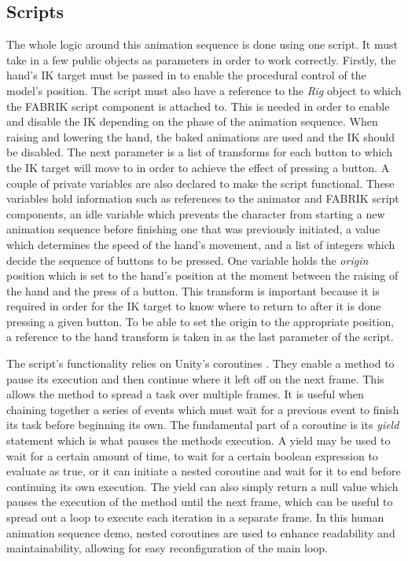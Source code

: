 \subsection{Scripts}
The whole logic around this animation sequence is done using one script. It must
take in a few public objects as parameters in order to work correctly. Firstly,
the hand's IK target must be passed in to enable the procedural control of the
model's position. The script must also have a reference to the \textit{Rig}
object to which the FABRIK script component is attached to. This is needed in
order to enable and disable the IK depending on the phase of the animation
sequence. When raising and lowering the hand, the baked animations are used and
the IK should be disabled. The next parameter is a list of transforms for each
button to which the IK target will move to in order to achieve the effect of
pressing a button. A couple of private variables are also declared to make the
script functional. These variables hold information such as references to the
animator and FABRIK script components, an idle variable which prevents the
character from starting a new animation sequence before finishing one that was
previously initiated, a value which determines the speed of the hand's movement,
and a list of integers which decide the sequence of buttons to be pressed. One
variable holds the \textit{origin} position which is set to the hand's
position at the moment between the raising of the hand and the press of
a button. This transform is important because it is required in order for the IK
target to know where to return to after it is done pressing a given button. To
be able to set the origin to the appropriate position, a reference to the hand
transform is taken in as the last parameter of the script.

The script's functionality relies on Unity's coroutines \cite{unity_coroutines}.
They enable a method to pause its execution and then continue where it left off
on the next frame. This allows the method to spread a task over multiple frames.
It is useful when chaining together a series of events which must wait for
a previous event to finish its task before beginning its own. The fundamental
part of a coroutine is its \textit{yield} statement which is what pauses the
methods execution. A yield may be used to wait for a certain amount of time, to
wait for a certain boolean expression to evaluate as true, or it can initiate
a nested coroutine and wait for it to end before continuing its own execution.
The yield can also simply return a null value which pauses the execution of the
method until the next frame, which can be useful to spread out a loop to execute
each iteration in a separate frame. In this human animation sequence demo,
nested coroutines are used to enhance readability and maintainability, allowing
for easy reconfiguration of the main loop. 

